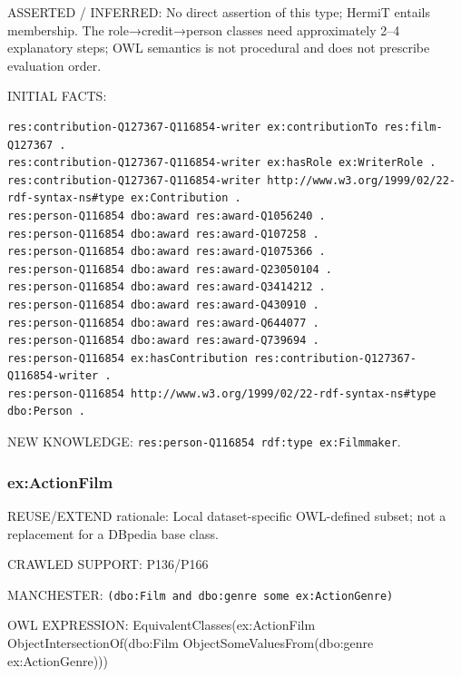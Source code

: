 \documentclass[
  11pt,
]{article}
\begin{document}
ASSERTED / INFERRED: No direct assertion of this type; HermiT entails
membership. The role→credit→person classes need
approxim\allowbreak{}ately 2--4 explanatory steps; OWL semantics is not
procedural and does not prescribe evaluation order.

INITIAL FACTS:

\begin{verbatim}
res:contribution-Q127367-Q116854-writer ex:contributionTo res:film-Q127367 .
res:contribution-Q127367-Q116854-writer ex:hasRole ex:WriterRole .
res:contribution-Q127367-Q116854-writer http://www.w3.org/1999/02/22-rdf-syntax-ns#type ex:Contribution .
res:person-Q116854 dbo:award res:award-Q1056240 .
res:person-Q116854 dbo:award res:award-Q107258 .
res:person-Q116854 dbo:award res:award-Q1075366 .
res:person-Q116854 dbo:award res:award-Q23050104 .
res:person-Q116854 dbo:award res:award-Q3414212 .
res:person-Q116854 dbo:award res:award-Q430910 .
res:person-Q116854 dbo:award res:award-Q644077 .
res:person-Q116854 dbo:award res:award-Q739694 .
res:person-Q116854 ex:hasContribution res:contribution-Q127367-Q116854-writer .
res:person-Q116854 http://www.w3.org/1999/02/22-rdf-syntax-ns#type dbo:Person .
\end{verbatim}

NEW KNOWLEDGE:
\texttt{res:\allowbreak{}pers\allowbreak{}on-\allowbreak{}\allowbreak{}Q1168\allowbreak{}54 rdf:\allowbreak{}t\allowbreak{}ype ex:\allowbreak{}\allowbreak{}F\allowbreak{}ilmmaker\allowbreak{}}.

\subsubsection{\texorpdfstring{ex:\allowbreak{}\allowbreak{}Actio\allowbreak{}n\allowbreak{}Film}{}}\label{exactionfilm}

REUSE/EXTEND rationale: Local dataset-\allowbreak{}specific\allowbreak{}
OWL-defined subset; not a replacement for a DBpedia base class.

CRAWLED SUPPORT: P136/P166

MANCHESTER:
\texttt{(dbo:\allowbreak{}\allowbreak{}Fil\allowbreak{}m and db\allowbreak{}o:\allowbreak{}genre \allowbreak{}some ex:\allowbreak{}\allowbreak{}Action\allowbreak{}Ge\allowbreak{}nre)}

OWL EXPRESSION:
Equivale\allowbreak{}nt\allowbreak{}Classe\allowbreak{}s(ex:\allowbreak{}\allowbreak{}Act\allowbreak{}ion\allowbreak{}Film
Object\allowbreak{}In\allowbreak{}tersecti\allowbreak{}on\allowbreak{}Of(dbo\allowbreak{}:\allowbreak{}\allowbreak{}Film
Object\allowbreak{}So\allowbreak{}me\allowbreak{}Values\allowbreak{}\allowbreak{}From(dbo\allowbreak{}:\allowbreak{}genre
ex:\allowbreak{}\allowbreak{}Actio\allowbreak{}n\allowbreak{}Genre))\allowbreak{})
\end{document}
